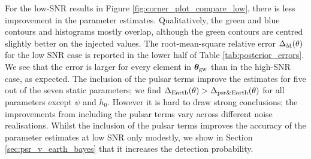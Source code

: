 \documentclass[fleqn,usenatbib,useAMS]{mnras}
\begin{document}
For the low-SNR results in Figure \ref{fig:corner_plot_compare_low}, there is less improvement in the parameter estimates. Qualitatively, the green and blue contours and histograms mostly overlap, although the green contours are centred slightly better on the injected values. The root-mean-square relative error $\Delta_{\rm M}(\theta)$ for the low SNR case is reported in the lower half of Table \ref{tab:posterior_errors}. We see that the error is larger for every element in $\boldsymbol{\theta}_{\rm gw}$ than in the high-SNR case, as expected. The inclusion of the pulsar terms improve the estimates for five out of the seven static parameters; we find $\Delta_{\rm Earth}(\theta) > \Delta_{\rm psr \& Earth}(\theta)$ for all parameters except $\psi$ and $h_0$. However it is hard to draw strong conclusions; the improvements from including the pulsar terms vary across different noise realisations. Whilst the inclusion of the pulsar terms improves the accuracy of the parameter estimates at low SNR only modestly, we show in Section \ref{sec:psr_v_earth_bayes} that it increases the detection probability. \newline 
\end{document}
